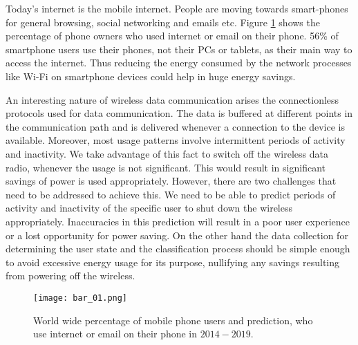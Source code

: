 Today's internet is the mobile internet. People are moving towards smart-phones for general browsing, social networking and emails etc. Figure \ref{fig:bar} shows the percentage of phone owners who used internet or email on their phone. 56\% of smartphone users use their phones, not their PCs or tablets, as their main way to access the internet. Thus reducing the energy consumed by the network processes like Wi-Fi on smartphone devices could help in huge energy savings.

\begin{center}
\begin{figure}[ht]
\end{figure}
\end{center}

An interesting nature of wireless data communication arises the connectionless protocols used for
data communication. The data is buffered at different points in the communication path and is delivered
whenever a connection to the device is available. Moreover, most usage patterns involve intermittent
periods of activity and inactivity. We take advantage of this fact to switch off the wireless data radio,
whenever the usage is not significant. This would result in significant savings of power is used appropriately.
However, there are two challenges that need to be addressed to achieve this. We need to be able to
predict periods of activity and inactivity of the specific user to shut down the wireless appropriately.
Inaccuracies in this prediction will result in a poor user experience or a lost opportunity for power saving.
On the other hand the data collection for determining the user state and the classification process should
be simple enough to avoid excessive energy usage for its purpose, nullifying any savings resulting
from powering off the wireless.

\begin{figure}[h]
\centering
\texttt{[image: bar\_01.png]}
\caption{World wide percentage of mobile phone users and prediction, who use internet or email on their phone in $2014-2019$\cite{survey}.}
\label{fig:bar}
\end{figure}

